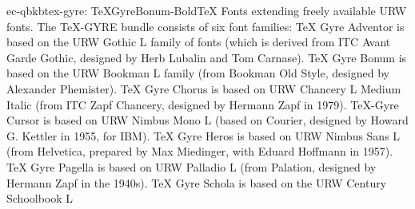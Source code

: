 \documentclass{ddltxtyp}
\begin{document}
\begin{package}{ec-qbkb}{tex-gyre: TeXGyreBonum-Bold}{{\TeX} Fonts extending freely available URW fonts.}
The {\TeX}-GYRE bundle consists of six font families: {\TeX} Gyre
Adventor is based on the URW Gothic L family of fonts (which is
derived from ITC Avant Garde Gothic, designed by Herb Lubalin
and Tom Carnase). {\TeX} Gyre Bonum is based on the URW Bookman L
family (from Bookman Old Style, designed by Alexander
Phemister). {\TeX} Gyre Chorus is based on URW Chancery L Medium
Italic (from ITC Zapf Chancery, designed by Hermann Zapf in
1979). {\TeX}-Gyre Cursor is based on URW Nimbus Mono L (based on
Courier, designed by Howard G. Kettler in 1955, for IBM). {\TeX}
Gyre Heros is based on URW Nimbus Sans L (from Helvetica,
prepared by Max Miedinger, with Eduard Hoffmann in 1957). {\TeX}
Gyre Pagella is based on URW Palladio L (from Palation,
designed by Hermann Zapf in the 1940s). {\TeX} Gyre Schola is
based on the URW Century Schoolbook L %
\end{package}
\end{document}
